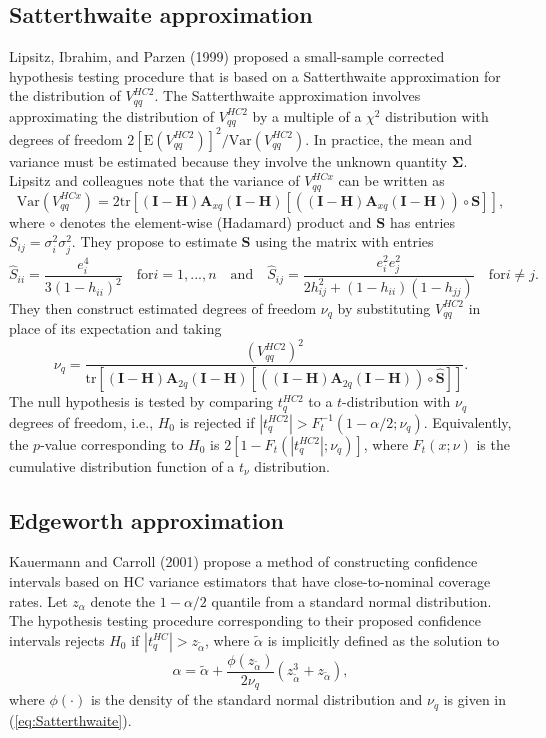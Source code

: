 \documentclass{article}\usepackage[]{graphicx}\usepackage[]{color}
\newcommand{\E}{\text{E}}
\newcommand{\Var}{\text{Var}}
\newcommand{\tr}{\text{tr}}
\newcommand{\bm}{\mathbf}
\newcommand{\bs}{\boldsymbol}
\begin{document}
\subsection{Satterthwaite approximation}

Lipsitz, Ibrahim, and Parzen (1999) proposed a small-sample corrected hypothesis testing procedure that is based on a Satterthwaite approximation for the distribution of $V^{HC2}_{qq}$. The Satterthwaite approximation involves approximating the distribution of $V^{HC2}_{qq}$ by a multiple of a $\chi^2$ distribution with degrees of freedom $2 \left[\E\left(V^{HC2}_{qq}\right)\right]^2 / \Var\left(V^{HC2}_{qq}\right)$. In practice, the mean and variance must be estimated because they involve the unknown quantity $\bs\Sigma$. Lipsitz and colleagues note that the variance of $V^{HCx}_{qq}$ can be written as \[
\Var\left(V^{HCx}_{qq}\right) = 2\tr\left[\left(\bm{I} - \bm{H}\right)\bm{A}_{xq} \left(\bm{I} - \bm{H}\right)\left[\left(\left(\bm{I} - \bm{H}\right)\bm{A}_{xq} \left(\bm{I} - \bm{H}\right)\right)\circ \bm{S}\right]\right], \]
where $\circ$ denotes the element-wise (Hadamard) product and $\bm{S}$ has entries $S_{ij} = \sigma_i^2 \sigma_j^2$. They propose to estimate $\bm{S}$ using the matrix with entries \[
\hat{S}_{ii} = \frac{e_i^4}{3(1 - h_{ii})^2} \quad \text{for} i = 1,...,n \quad \text{and} \quad \hat{S}_{ij} = \frac{e_i^2 e_j^2}{2 h_{ij}^2 + (1 - h_{ii})(1 - h_{jj})} \quad \text{for} i \neq j. \]
They then construct estimated degrees of freedom $\nu_q$ by substituting $V^{HC2}_{qq}$ in place of its expectation and taking 
\begin{equation}
\label{eq:Satterthwaite}
\nu_q = \frac{\left(V^{HC2}_{qq}\right)^2}{\tr\left[\left(\bm{I} - \bm{H}\right)\bm{A}_{2q} \left(\bm{I} - \bm{H}\right)\left[\left(\left(\bm{I} - \bm{H}\right)\bm{A}_{2q} \left(\bm{I} - \bm{H}\right)\right)\circ \bm{\hat{S}}\right]\right]}.
\end{equation}
The null hypothesis is tested by comparing $t^{HC2}_q$ to a $t$-distribution with $\nu_q$ degrees of freedom, i.e., $H_0$ is rejected if $|t^{HC2}_q| > F_t^{-1}(1 - \alpha / 2; \nu_q)$. Equivalently, the $p$-value corresponding to $H_0$ is $2 \left[1 - F_t\left(|t_q^{HC2}|; \nu_q\right)\right]$, where $F_t(x; \nu)$ is the cumulative distribution function of a $t_\nu$ distribution.

\subsection{Edgeworth approximation}

Kauermann and Carroll (2001) propose a method of constructing confidence intervals based on HC variance estimators that have close-to-nominal coverage rates. Let $z_{\alpha}$ denote the $1 - \alpha / 2$ quantile from a standard normal distribution. The hypothesis testing procedure corresponding to their proposed confidence intervals rejects $H_0$ if $\left|t^{HC}_q\right| > z_{\tilde\alpha}$, where $\tilde\alpha$ is implicitly defined as the solution to \[
\alpha = \tilde\alpha + \frac{\phi\left(z_{\tilde\alpha}\right)}{2 \nu_q}\left(z_{\tilde\alpha}^3 + z_{\tilde\alpha}\right), \]
where $\phi(\cdot)$ is the density of the standard normal distribution and $\nu_q$ is given in (\ref{eq:Satterthwaite}).
\end{document}
